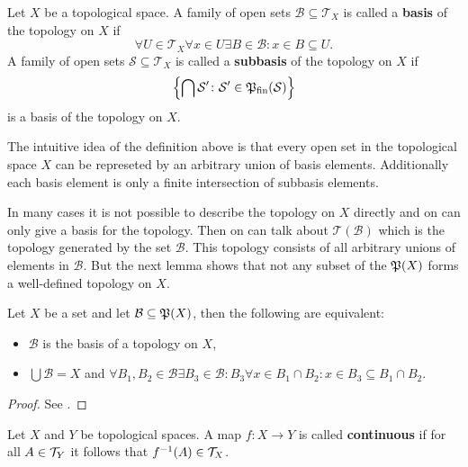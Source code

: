 \begin{defin}
  Let $X$ be a topological space. A family of open sets $\mathcal{B} \subseteq \mathcal{T}_X$ is called a \textbf{basis} of the topology on $X$ if
  \begin{equation*}
    \forall U \in \mathcal{T}_X\forall x \in U\exists B \in\mathcal{B}\colon x \in B \subseteq U.
  \end{equation*}
  A family of open sets $\mathcal{S} \subseteq \mathcal{T}_X$ is called a \textbf{subbasis} of the topology on $X$ if
  \begin{equation*}
    \left\{\bigcap \mathcal{S}'\colon \mathcal{S}'\in \mathfrak{P}_{\text{fin}}(\mathcal{S})\right\}
  \end{equation*}
  is a basis of the topology on $X$.
\end{defin}
The intuitive idea of the definition above is that every open set in the topological space $X$ can be represeted by an arbitrary union of basis elements. Additionally each basis element is only a finite intersection of subbasis elements.

In many cases it is not possible to describe the topology on $X$ directly and on can only give a basis for the topology. Then on can talk about $\mathcal{T}(\mathcal{B})$ which is the topology generated by the set $\mathcal{B}$. This topology consists of all arbitrary unions of elements in $\mathcal{B}$. But the next lemma shows that not any subset of the $\mathfrak{P}(X)$ forms a well-defined topology on $X$.

\begin{lemma}
  Let $X$ be a set and let $\mathcal{B} \subseteq \mathfrak{P}(X)$, then the following are equivalent:
  \begin{itemize}
  \item $\mathcal{B}$ is the basis of a topology on $X$,
    \item $\bigcup \mathcal{B} = X$ and $\forall B_1, B_2 \in \mathcal{B}\exists B_3 \in \mathcal{B}\colon B_3\forall x \in B_1\cap B_2\colon x \in B_3 \subseteq B_1\cap B_2$.
  \end{itemize}
\end{lemma}

\begin{proof}
  See \cite[p. 78f.]{MunTop}.
\end{proof}

\begin{defin}
  Let $X$ and $Y$ be topological spaces. A map $f\colon X \to Y$ is called \textbf{continuous} if for all $A \in \mathcal{T}_Y$ it follows that $f^{-1}(A) \in \mathcal{T}_X$.  
\end{defin}

